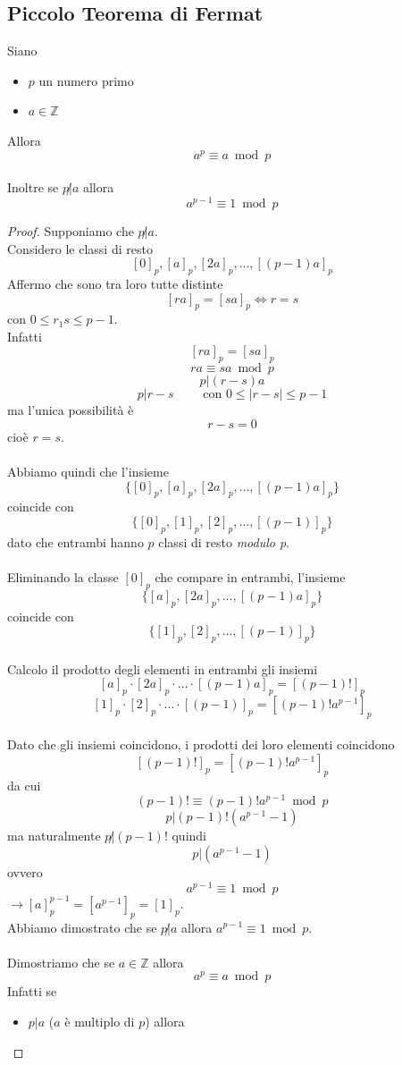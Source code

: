 \documentclass[a4paper,12pt, oneside]{book}
\begin{document}
\subsection{Piccolo Teorema di Fermat}
\begin{teorema}
	Siano \begin{itemize}
		\item $p$ un numero primo
		\item $a \in \mathbb{Z}$
	\end{itemize}
	Allora $$a^p \equiv a \bmod p$$\\
	Inoltre se $p \not| a$ allora $$a^{p-1} \equiv 1 \bmod p$$

	\begin{proof}
		Supponiamo che $p \not | a$.\\
		Considero le classi di resto
		$$[0]_p, [a]_p, [2a]_p, \dots, [(p-1)a]_p$$
		Affermo che sono tra loro tutte distinte
		$$[ra]_p=[sa]_p \iff r=s$$ con $0 \leq r_1s \leq p-1$.\\
		Infatti
		$$[ra]_p=[sa]_p$$
		$$ra \equiv sa \bmod p$$
		$$p|(r-s)a$$
		$$p|r-s \qquad \mbox{ con } 0 \leq |r-s| \leq p-1$$
		ma l'unica possibilità è $$r-s=0$$ cioè $r=s$.\\\\
		Abbiamo quindi che l'insieme
		$$\{ [0]_p, [a]_p, [2a]_p, \dots, [(p-1)a]_p \}$$ coincide con $$\{ [0]_p, [1]_p, [2]_p, \dots, [(p-1)]_p \}$$
		dato che entrambi hanno $p$ classi di resto \textit{modulo p}.\\\\
		Eliminando la classe $[0]_p$ che compare in entrambi, l'insieme
		$$\{ [a]_p, [2a]_p, \dots, [(p-1)a]_p \}$$ coincide con $$\{ [1]_p, [2]_p, \dots, [(p-1)]_p \}$$\\
		Calcolo il prodotto degli elementi in entrambi gli insiemi
		$$ [a]_p \cdot [2a]_p \cdot \dots \cdot [(p-1)a]_p  = [(p-1)!]_p$$
		$$ [1]_p \cdot [2]_p \cdot \dots \cdot [(p-1)]_p = [(p-1)! a^{p-1}]_p$$\\
		Dato che gli insiemi coincidono, i prodotti dei loro elementi coincidono $$[(p-1)!]_p = [(p-1)! a^{p-1}]_p$$
		da cui
		$$(p-1)! \equiv (p-1)! a^{p-1} \bmod p$$
		$$p|(p-1)! (a^{p-1}-1)$$
		ma naturalmente $p \not | (p-1)!$ quindi
		$$p|(a^{p-1}-1)$$
		ovvero
		$$a^{p-1} \equiv 1 \bmod p$$
		$\longrightarrow [a]^{p-1}_p = [a^{p-1}]_p = [1]_p$.\\
		Abbiamo dimostrato che se $p \not | a$ allora $a^{p-1} \equiv 1 \bmod p$.\\\\
		Dimostriamo che se $a \in \mathbb{Z}$ allora $$a^p \equiv a \bmod p$$
		Infatti se \begin{itemize}
			\item $p|a$ ($a$ è multiplo di $p$) allora


\end{itemize}
\end{proof}
\end{teorema}
\end{document}
